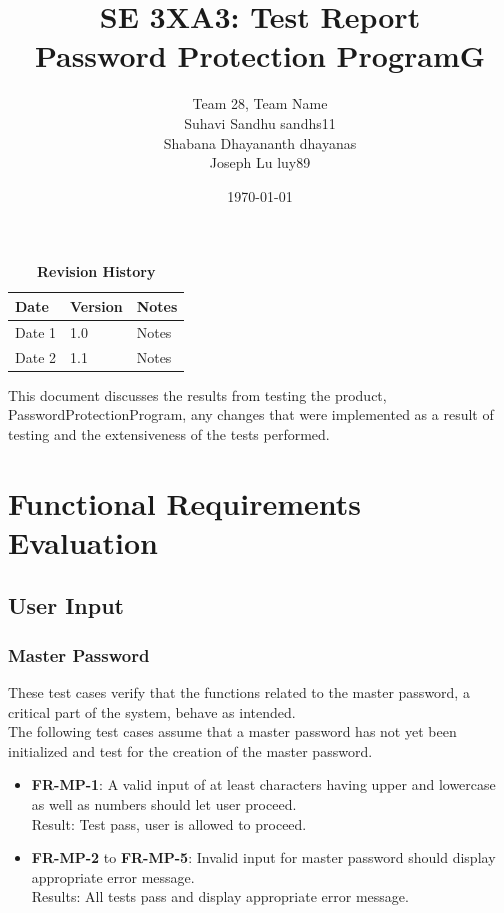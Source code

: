 \documentclass[12pt, titlepage]{article}
\title{SE 3XA3: Test Report\\Password Protection ProgramG}
\author{Team 28, Team Name
		\\ Suhavi Sandhu sandhs11
		\\ Shabana Dhayananth dhayanas
		\\ Joseph Lu luy89
}
\date{\today}
\begin{document}
\maketitle

\tableofcontents
\listoftables
\listoffigures

\begin{table}[bp]
\caption{\bf Revision History}
\begin{tabularx}{\textwidth}{p{3cm}p{2cm}X}
\toprule {\bf Date} & {\bf Version} & {\bf Notes}\\
\midrule
Date 1 & 1.0 & Notes\\
Date 2 & 1.1 & Notes\\
\bottomrule
\end{tabularx}
\end{table}

\newpage


This document discusses the results from testing the product, PasswordProtectionProgram, any changes that were implemented as a result of testing and the extensiveness of the tests performed.

\section{Functional Requirements Evaluation}

	\subsection{User Input}
	
		\subsubsection{Master Password}
			These test cases verify that the functions related to the master password, a critical part of the system, behave as intended.\\
			
			The following test cases assume that a master password has not yet been initialized and test for the creation of the master password.
			
			\begin{itemize}
			
				\item \textbf{FR-MP-1}: A valid input of at least characters having upper and lowercase as well as numbers should let user proceed.\\
				 Result: Test pass, user is allowed to proceed.
				 
				\item \textbf{FR-MP-2} to \textbf{FR-MP-5}: Invalid input for master password should display appropriate error message.\\
				 Results: All tests pass and display appropriate error message.
			
			\end{itemize}
			 
\end{document}
